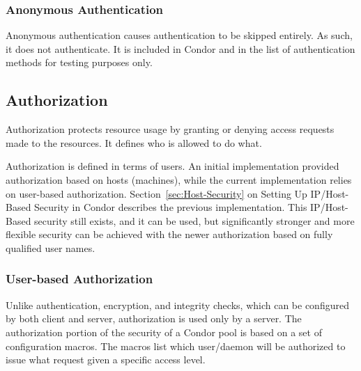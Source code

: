 \subsubsection{\label{sec:ANON-Authentication}Anonymous Authentication}
Anonymous authentication causes authentication to be skipped entirely.
As such, it does not authenticate.
It is included in Condor and in the list of authentication methods
for testing purposes only.


\subsection{\label{sec:Security-Authorization} Authorization}

Authorization protects resource usage by granting or denying
access requests made to the resources.
It defines who is allowed to do what.

Authorization is defined in terms of users.
An initial implementation provided authorization
based on hosts (machines), while the current implementation
relies on user-based authorization.
Section~\ref{sec:Host-Security}
on Setting Up IP/Host-Based Security in Condor describes the
previous implementation.
This IP/Host-Based security still exists, and it can be used,
but significantly stronger and more flexible
security can be achieved with the newer
authorization based on fully qualified user names.

\subsubsection{\label{sec:Security-UserAuthorization}User-based Authorization}


Unlike authentication, encryption, and integrity checks,
which can be configured by both client and server,
authorization is used only by a server.
The authorization portion of the security of a Condor pool is
based on a set of configuration macros.
The macros list which user/daemon will be authorized
to issue what request given a specific access level.


